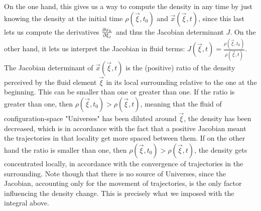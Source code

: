 \documentclass[11pt, a4paper]{article} %
\begin{document}
On the one hand, this gives us a way to compute the density in any time by just knowing the density at the initial time $\rho(\vec{\xi},t_0)$ and $\vec{x}(\vec{\xi},t)$, since this last lets us compute the derivatives $\pdv{x_k}{\xi_j}$ and thus the Jacobian determinant $J$. On the other hand, it lets us interpret the Jacobian in fluid terms: $J(\vec{\xi},t)=\frac{\rho(\vec{\xi},t_0)}{\rho(\vec{\xi},t)}$. The Jacobian determinant of $\vec	{x}(\vec{\xi},t)$ is the (positive) ratio of the density perceived by the fluid element $\vec{\xi}$ in its local surrounding relative to the one at the beginning. This can be smaller than one or greater than one. If the ratio is greater than one, then $\rho(\vec{\xi},t_0)>\rho(\vec{\xi},t)$, meaning that the fluid of configuration-space "Universes" has been diluted around $\vec{\xi}$, the density has been decreased, which is in accordance with the fact that a positive Jacobian meant the trajectories in that locality get more spaced between them. If on the other hand the ratio is smaller than one, then $\rho(\vec{\xi},t_0)>\rho(\vec{\xi},t)$, the density gets concentrated locally, in accordance with the convergence of trajectories in the surrounding. Note though that there is no source of Universes, since the Jacobian, accounting only for the movement of trajectories, is the only factor influencing the density change. This is precisely what we imposed with the integral above.
\end{document}
